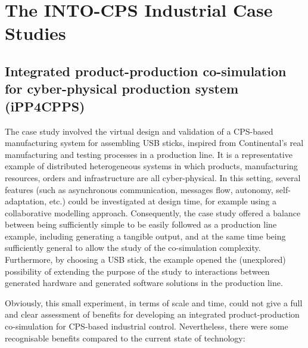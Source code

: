 
\section{The INTO-CPS Industrial Case Studies}\label{sec:casestudies}


\subsection{Integrated product-production co-simulation for cyber-physical production system (iPP4CPPS) } 

The case study involved the virtual design and validation of a CPS-based manufacturing system for assembling USB sticks, inspired from Continental's real manufacturing and testing processes in a production line. It is a representative example of distributed heterogeneous systems in which products, manufacturing resources, orders and infrastructure are all cyber-physical. In this setting, several features (such as asynchronous communication, messages flow, autonomy, self-adaptation, etc.) could be investigated at design time, for example using a collaborative modelling approach. Consequently, the case study offered a balance between being sufficiently simple to be easily followed as a production line example, including generating a tangible output, and at the same time being sufficiently general to allow the study of the co-simulation complexity. Furthermore, by choosing a USB stick, the example opened the (unexplored) possibility of extending the purpose of the study to interactions between generated hardware and generated software solutions in the production line.

Obviously, this small experiment, in terms of scale and time, could not give a full and clear assessment of benefits for developing an integrated product-production co-simulation for CPS-based industrial control. Nevertheless, there were some recognisable benefits compared to the current state of technology:

